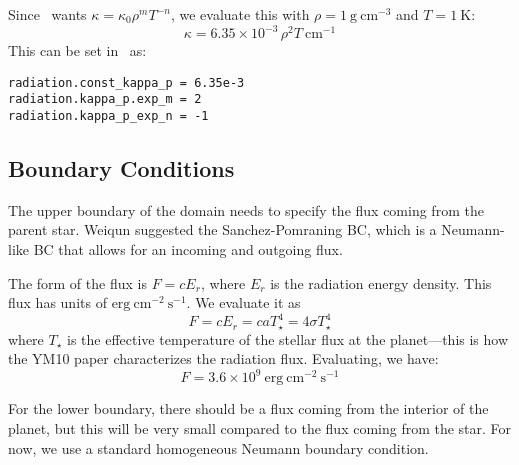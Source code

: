 \documentclass[11pt]{article}
\newcommand{\gcc}{\mathrm{g~cm^{-3} }}
\newcommand{\castro}{{\sffamily{Castro}}}
\begin{document}
Since \castro\ wants $\kappa = \kappa_0 \rho^m T^{-n}$, we evaluate
this with $\rho = 1~\gcc$ and $T = 1~\mathrm{K}$:
\begin{equation}
  \kappa = 6.35 \times 10^{-3} \, \rho^2 T~\mathrm{cm^{-1}}
\end{equation}
This can be set in \castro\ as:
\begin{verbatim}
radiation.const_kappa_p = 6.35e-3
radiation.kappa_p.exp_m = 2
radiation.kappa_p_exp_n = -1
\end{verbatim}


\subsection{Boundary Conditions}

The upper boundary of the domain needs to specify the flux coming from
the parent star.  Weiqun suggested the Sanchez-Pomraning BC, which is
a Neumann-like BC that allows for an incoming and outgoing flux.

The form of the flux is $F = cE_r$, where $E_r$ is the radiation
energy density.  This flux has units of $\mathrm{erg~cm^{-2}~s^{-1}}$.
We evaluate it as
\begin{equation}
  F = cE_r = c a T_\star^4 = 4\sigma T_\star^4
\end{equation}
where $T_\star$ is the effective temperature of the stellar flux at
the planet---this is how the YM10 paper characterizes the radiation
flux.  Evaluating, we have:
\begin{equation}
  F = 3.6\times 10^9~\mathrm{erg~cm^{-2}~s^{-1}}
\end{equation}

For the lower boundary, there should be a flux coming from the
interior of the planet, but this will be very small compared to the
flux coming from the star.  For now, we use a standard homogeneous
Neumann boundary condition.
\end{document}
